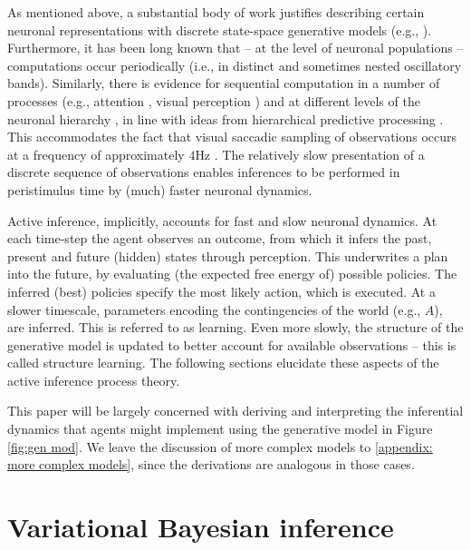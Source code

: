\documentclass[review,12pt,authoryear]{elsarticle}
\begin{document}
As mentioned above, a substantial body of work justifies describing certain neuronal representations with discrete state-space generative models (e.g., \citep{zhangDiscreteFixedResolutionRepresentations2008,luckCapacityVisualWorking1997,teeInformationBrainRepresented2018}). Furthermore, it has been long known that -- at the level of neuronal populations -- computations occur periodically (i.e., in distinct and sometimes nested oscillatory bands). Similarly, there is evidence for sequential computation in a number of processes (e.g., attention \citep{buschmanShiftingSpotlightAttention2010,duncanDirectMeasurementAttentional1994,landauAttentionSamplesStimuli2012}, visual perception \citep{hanslmayrPrestimulusOscillatoryPhase2013,rollsProcessingSpeedCerebral1994}) and at different levels of the neuronal hierarchy \citep{fristonDeepTemporalModels2018,fristonHierarchicalModelsBrain2008}, in line with ideas from hierarchical predictive processing \citep{chaoLargeScaleCorticalNetworks2018,iglesiasHierarchicalPredictionErrors2013}. This accommodates the fact that visual saccadic sampling of observations occurs at a frequency of approximately $4$Hz \citep{parrDiscreteContinuousBrain2018}. The relatively slow presentation of a discrete sequence of observations enables inferences to be performed in peristimulus time by (much) faster neuronal dynamics.

Active inference, implicitly, accounts for fast and slow neuronal dynamics. At each time-step the agent observes an outcome, from which it infers the past, present and future (hidden) states through perception. This underwrites a plan into the future, by evaluating (the expected free energy of) possible policies. The inferred (best) policies specify the most likely action, which is executed. At a slower timescale, parameters encoding the contingencies of the world (e.g., $A$), are inferred. This is referred to as learning. Even more slowly, the structure of the generative model is updated to better account for available observations -- this is called structure learning. The following sections elucidate these aspects of the active inference process theory.

This paper will be largely concerned with deriving and interpreting the inferential dynamics that agents might implement using the generative model in Figure \ref{fig:gen mod}. We leave the discussion of more complex models to \ref{appendix: more complex models}, since the derivations are analogous in those cases.

\section{Variational Bayesian inference}
\label{sec: VB}
\end{document}
